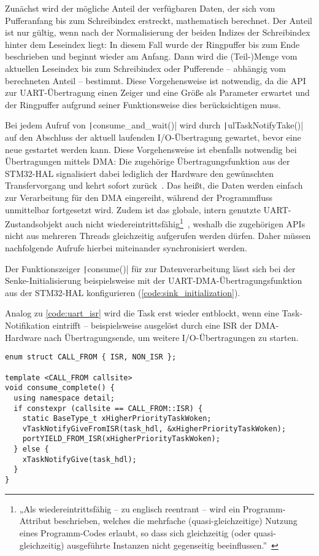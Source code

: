 Zunächst wird der mögliche Anteil der verfügbaren Daten, der sich vom
Pufferanfang bis zum Schreibindex erstreckt, mathematisch berechnet. Der Anteil
ist nur gültig, wenn nach der Normalisierung der beiden Indizes der Schreibindex
hinter dem Leseindex liegt: In diesem Fall wurde der Ringpuffer bis zum Ende
beschrieben und beginnt wieder am Anfang. Dann wird die (Teil-)Menge vom
aktuellen Leseindex bis zum Schreibindex oder Pufferende -- abhängig vom
berechneten Anteil -- bestimmt. Diese Vorgehensweise ist notwendig, da die API
zur UART-Übertragung einen Zeiger und eine Größe als Parameter erwartet und der
Ringpuffer aufgrund seiner Funktionsweise dies berücksichtigen muss.

Bei jedem Aufruf von \texttt|consume_and_wait()| wird durch
\texttt|ulTaskNotifyTake()| auf den Abschluss der aktuell laufenden
I/O-Übertragung gewartet, bevor eine neue gestartet werden kann. Diese
Vorgehensweise ist ebenfalls notwendig bei Übertragungen mittels DMA: Die
zugehörige Übertragungsfunktion aus der STM32-HAL signalisiert dabei lediglich
der Hardware den gewünschten Transfervorgang und kehrt sofort
zurück~\cite{HAL_UART_Transmit_DMA}. Das heißt, die Daten werden einfach zur
Verarbeitung für den DMA eingereiht, während der Programmfluss unmittelbar
fortgesetzt wird. Zudem ist das globale, intern genutzte UART-Zustandsobjekt
auch nicht wiedereintrittsfähig\footnote{„Als wiedereintrittsfähig -- zu
englisch reentrant -- wird ein Programm-Attribut beschrieben, welches die
mehrfache (quasi-gleichzeitige) Nutzung eines Programm-Codes erlaubt, so dass
sich gleichzeitig (oder quasi-gleichzeitig) ausgeführte Instanzen nicht
gegenseitig
beeinflussen.”~\cite{wiedereintrittsfaehigkeit}}~\cite{stm32_hal_reentrancy},
weshalb die zugehörigen APIs nicht aus mehreren Threads gleichzeitig aufgerufen
werden dürfen. Daher müssen nachfolgende Aufrufe hierbei miteinander
synchronisiert werden.

Der Funktionszeiger \texttt|consume()| für zur Datenverarbeitung lässt
sich bei der Senke-Initialisierung beispielsweise mit der
UART-DMA-Übertragungsfunktion aus der STM32-HAL konfigurieren
(\ref{code:sink_initialization}).

Analog zu \ref{code:uart_isr} wird die Task erst wieder entblockt, wenn eine
Task-Notifikation eintrifft -- beispielsweise ausgelöst durch eine \ac{ISR} der
DMA-Hardware nach Übertragungsende, um weitere I/O-Übertragungen zu starten.

\begin{code}
\begin{verbatim}
enum struct CALL_FROM { ISR, NON_ISR };

template <CALL_FROM callsite>
void consume_complete() {
  using namespace detail;
  if constexpr (callsite == CALL_FROM::ISR) {
    static BaseType_t xHigherPriorityTaskWoken;
    vTaskNotifyGiveFromISR(task_hdl, &xHigherPriorityTaskWoken);
    portYIELD_FROM_ISR(xHigherPriorityTaskWoken);
  } else {
    xTaskNotifyGive(task_hdl);
  }
}
\end{verbatim}
\end{code}

